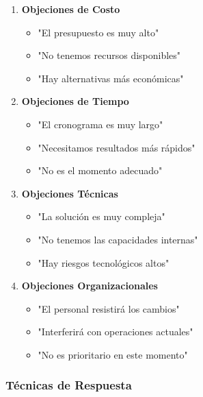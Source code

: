 \documentclass[12pt,letterpaper,oneside]{book}
\begin{document}
\begin{enumerate}
\item \textbf{Objeciones de Costo}
   \begin{itemize}
   \item "El presupuesto es muy alto"
   \item "No tenemos recursos disponibles"
   \item "Hay alternativas más económicas"
   \end{itemize}

\item \textbf{Objeciones de Tiempo}
   \begin{itemize}
   \item "El cronograma es muy largo"
   \item "Necesitamos resultados más rápidos"
   \item "No es el momento adecuado"
   \end{itemize}

\item \textbf{Objeciones Técnicas}
   \begin{itemize}
   \item "La solución es muy compleja"
   \item "No tenemos las capacidades internas"
   \item "Hay riesgos tecnológicos altos"
   \end{itemize}

\item \textbf{Objeciones Organizacionales}
   \begin{itemize}
   \item "El personal resistirá los cambios"
   \item "Interferirá con operaciones actuales"
   \item "No es prioritario en este momento"
   \end{itemize}
\end{enumerate}

\subsubsection{Técnicas de Respuesta}
\end{document}
